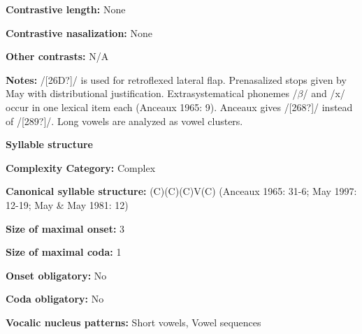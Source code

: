\begin{styleBody}
\textbf{Contrastive length:} None
\end{styleBody}

\begin{styleBody}
\textbf{Contrastive nasalization:} None
\end{styleBody}

\begin{styleBody}
\textbf{Other contrasts:} N/A
\end{styleBody}

\begin{styleBody}
\textbf{Notes:} /[26D?]/ is used for retroflexed lateral flap. Prenasalized stops given by May with distributional justification. Extrasystematical phonemes /$\beta $/ and /x/ occur in one lexical item each (Anceaux 1965: 9). Anceaux gives /[268?]/ instead of /[289?]/. Long vowels are analyzed as vowel clusters.
\end{styleBody}

\begin{styleBody}
\textbf{Syllable structure}
\end{styleBody}

\begin{styleBody}
\textbf{Complexity Category:} Complex
\end{styleBody}

\begin{styleBody}
\textbf{Canonical syllable structure:} (C)(C)(C)V(C)\textbf{ }(Anceaux 1965: 31-6; May 1997: 12-19; May \& May 1981: 12)
\end{styleBody}

\begin{styleBody}
\textbf{Size of maximal onset:} 3
\end{styleBody}

\begin{styleBody}
\textbf{Size of maximal coda:} 1
\end{styleBody}

\begin{styleBody}
\textbf{Onset obligatory:} No
\end{styleBody}

\begin{styleBody}
\textbf{Coda obligatory: }No
\end{styleBody}

\begin{styleBody}
\textbf{Vocalic nucleus patterns:} Short vowels, Vowel sequences
\end{styleBody}

